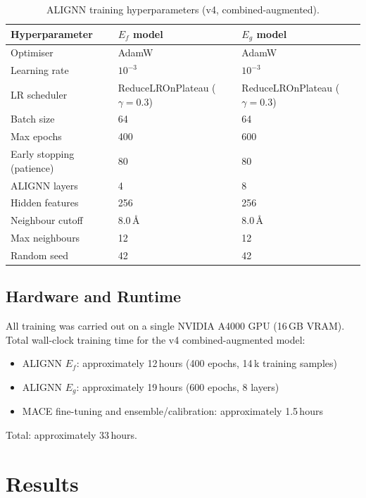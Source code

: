 \documentclass[10pt, a4paper]{article}
\begin{document}
\begin{table}[h!]
\centering
\caption{ALIGNN training hyperparameters (v4, combined-augmented).}
\label{tab:hparams}
\begin{tabular}{@{}lll@{}}
\toprule
Hyperparameter & $E_f$ model & $E_g$ model \\
\midrule
Optimiser            & AdamW        & AdamW \\
Learning rate        & $10^{-3}$    & $10^{-3}$ \\
LR scheduler         & ReduceLROnPlateau ($\gamma=0.3$) &
                       ReduceLROnPlateau ($\gamma=0.3$) \\
Batch size           & 64           & 64 \\
Max epochs           & 400          & 600 \\
Early stopping (patience) & 80      & 80 \\
ALIGNN layers        & 4            & 8 \\
Hidden features      & 256          & 256 \\
Neighbour cutoff     & 8.0\,\AA     & 8.0\,\AA \\
Max neighbours       & 12           & 12 \\
Random seed          & 42           & 42 \\
\bottomrule
\end{tabular}
\end{table}

\subsection{Hardware and Runtime}

All training was carried out on a single NVIDIA A4000 GPU (16\,GB VRAM).
Total wall-clock training time for the v4 combined-augmented model:
\begin{itemize}[nosep]
  \item ALIGNN $E_f$: approximately 12\,hours (400 epochs, 14\,k
    training samples)
  \item ALIGNN $E_g$: approximately 19\,hours (600 epochs, 8 layers)
  \item MACE fine-tuning and ensemble/calibration: approximately
    1.5\,hours
\end{itemize}
Total: approximately 33\,hours.

\section{Results}
\end{document}

